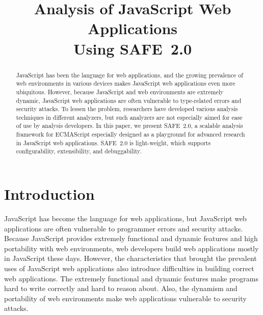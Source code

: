 \documentclass[10pt, conference]{IEEEtran}
\newcommand{\safe}{{SAFE~2.0}\xspace}
\begin{document}
\title{\hspace*{-.7em}
Analysis of JavaScript Web Applications\\ Using \safe}

\author{
\and
{}
\and
{}
\and
{}
}
\maketitle


\begin{abstract}
JavaScript has been the language for web applications, and
the growing prevalence of web environments in various devices
makes JavaScript web applications even more ubiquitous.
However, because JavaScript and web environments are
extremely dynamic, JavaScript web applications are often
vulnerable to type-related errors and security attacks.
To lessen the problem, researchers have developed various analysis
techniques in different analyzers, but such analyzers are not especially
aimed for ease of use by analysis developers.  In this paper, we present \safe, a scalable
analysis framework for ECMAScript especially designed as a playground
for advanced research in JavaScript web applications.  \safe is
light-weight, which supports configurability, extensibility, and
debuggability.
\end{abstract}


\section{Introduction}
JavaScript has become the language for web applications, but
JavaScript web applications are often vulnerable to programmer
errors and security attacks.  Because JavaScript provides
extremely functional and dynamic features and high portability
with web environments, web developers build web applications
mostly in JavaScript these days.  However, the characteristics
that brought the prevalent uses of JavaScript web applications
also introduce difficulties in building correct web applications.
The extremely functional and dynamic features make programs
hard to write correctly and hard to reason about.
Also, the dynamism and portability of web environments make
web applications vulnerable to security attacks.
\end{document}
